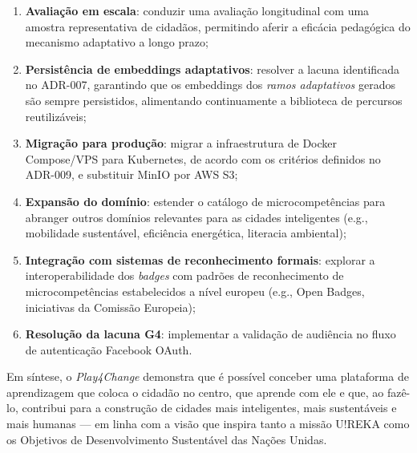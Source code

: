 \begin{enumerate}
  \item \textbf{Avaliação em escala}: conduzir uma avaliação longitudinal com uma amostra representativa de cidadãos, permitindo aferir a eficácia pedagógica do mecanismo adaptativo a longo prazo;
  \item \textbf{Persistência de embeddings adaptativos}: resolver a lacuna identificada no ADR-007, garantindo que os embeddings dos \textit{ramos adaptativos} gerados são sempre persistidos, alimentando continuamente a biblioteca de percursos reutilizáveis;
  \item \textbf{Migração para produção}: migrar a infraestrutura de Docker Compose/VPS para Kubernetes, de acordo com os critérios definidos no ADR-009, e substituir MinIO por AWS S3;
  \item \textbf{Expansão do domínio}: estender o catálogo de microcompetências para abranger outros domínios relevantes para as cidades inteligentes (e.g., mobilidade sustentável, eficiência energética, literacia ambiental);
  \item \textbf{Integração com sistemas de reconhecimento formais}: explorar a interoperabilidade dos \textit{badges} com padrões de reconhecimento de microcompetências estabelecidos a nível europeu (e.g., Open Badges, iniciativas da Comissão Europeia);
  \item \textbf{Resolução da lacuna G4}: implementar a validação de audiência no fluxo de autenticação Facebook OAuth.
\end{enumerate}

Em síntese, o \textit{Play4Change} demonstra que é possível conceber uma plataforma de aprendizagem que coloca o cidadão no centro, que aprende com ele e que, ao fazê-lo, contribui para a construção de cidades mais inteligentes, mais sustentáveis e mais humanas --- em linha com a visão que inspira tanto a missão U!REKA como os Objetivos de Desenvolvimento Sustentável das Nações Unidas.
